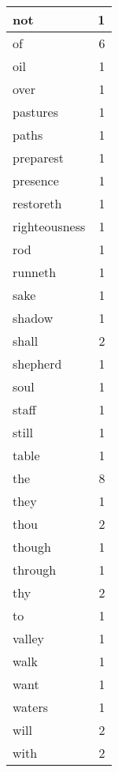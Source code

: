 \begin{center}
\begin{longtable}{l|r}
not & 1 \\ \hline
of & 6 \\ \hline
oil & 1 \\ \hline
over & 1 \\ \hline
pastures & 1 \\ \hline
paths & 1 \\ \hline
preparest & 1 \\ \hline
presence & 1 \\ \hline
restoreth & 1 \\ \hline
righteousness & 1 \\ \hline
rod & 1 \\ \hline
runneth & 1 \\ \hline
sake & 1 \\ \hline
shadow & 1 \\ \hline
shall & 2 \\ \hline
shepherd & 1 \\ \hline
soul & 1 \\ \hline
staff & 1 \\ \hline
still & 1 \\ \hline
table & 1 \\ \hline
the & 8 \\ \hline
they & 1 \\ \hline
thou & 2 \\ \hline
though & 1 \\ \hline
through & 1 \\ \hline
thy & 2 \\ \hline
to & 1 \\ \hline
valley & 1 \\ \hline
walk & 1 \\ \hline
want & 1 \\ \hline
waters & 1 \\ \hline
will & 2 \\ \hline
with & 2 \\ \hline
\end{longtable}
\end{center}



\normalsize




